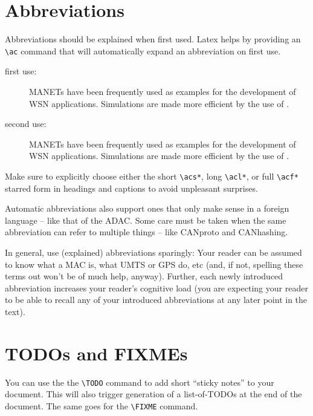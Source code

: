 \documentclass[]{ccs-thesis}
\begin{document}
\section{Abbreviations}

Abbreviations should be explained when first used.
Latex helps by providing an \verb|\ac| command that will automatically expand an abbreviation on first use.

\begin{description}

\item[first use:]
\acp{MANET} have been frequently used as examples for the development of \ac{WSN} applications.
Simulations are made more efficient by the use of .

\item[second use:]
\acp{MANET} have been frequently used as examples for the development of \ac{WSN} applications.
Simulations are made more efficient by the use of .

\end{description}

Make sure to explicitly choose either the short \verb|\acs*|, long \verb|\acl*|, or full \verb|\acf*| starred form in headings and captions to avoid unpleasant surprises.

Automatic abbreviations also support ones that only make sense in a foreign language -- like that of the \ac{ADAC}.
Some care must be taken when the same abbreviation can refer to multiple things -- like \ac{CANproto} and \ac{CANhashing}.

In general, use (explained) abbreviations sparingly:
Your reader can be assumed to know what a MAC is, what UMTS or GPS do, etc (and, if not, spelling these terms out won't be of much help, anyway).
Further, each newly introduced abbreviation increases your reader's cognitive load (you are expecting your reader to be able to recall any of your introduced abbreviations at any later point in the text).


\section{TODOs and FIXMEs}

You can use the the \verb|\TODO| command to add short ``sticky notes'' to your document.
This will also trigger generation of a list-of-TODOs at the end of the document.
The same goes for the \verb|\FIXME| command.
\end{document}
